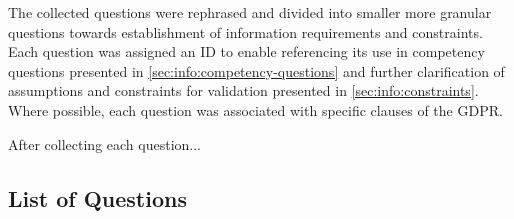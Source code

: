 The collected questions were rephrased and divided into smaller more granular questions towards establishment of information requirements and constraints. 
Each question was assigned an ID to enable referencing its use in competency questions presented in \autoref{sec:info:competency-questions} and further clarification of assumptions and constraints for validation presented in \autoref{sec:info:constraints}.
Where possible, each question was associated with specific clauses of the GDPR.

After collecting each question...

\subsection{List of Questions}
